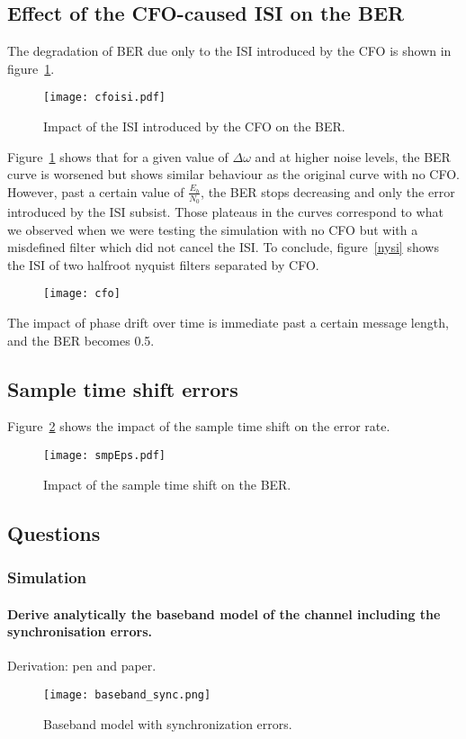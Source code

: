 \subsection{Effect of the CFO-caused ISI on the BER}
The degradation of BER due only to the ISI introduced by the CFO is shown in figure~\ref{fig:cfoisi}.
\begin{figure}[htbp]
\centering
\texttt{[image: cfoisi.pdf]}
\caption{Impact of the ISI introduced by the CFO on the BER.\label{fig:cfoisi}}
\end{figure}
Figure~\ref{fig:cfoisi} shows that for a given value of $\Delta\omega$ and at higher noise levels, the BER curve is worsened but shows similar behaviour as the original curve with no CFO.
However, past a certain value of $\frac{E_b}{N_0}$, the BER stops decreasing and only the error introduced by the ISI subsist.
Those plateaus in the curves correspond to what we observed when we were testing the simulation with no CFO but with a misdefined filter which did not cancel the ISI.
To conclude, figure~\ref{nysi} shows the ISI of two halfroot nyquist filters separated by CFO.
\begin{figure}[htbp]
    \centering
    \texttt{[image: cfo]}
\end{figure}



The impact of phase drift over time is immediate past a certain message length, and the BER becomes 0.5.

\subsection{Sample time shift errors}
Figure~\ref{fig:smpEps} shows the impact of the sample time shift on the error rate.
\begin{figure}[htbp]
\centering
\texttt{[image: smpEps.pdf]}
\caption{Impact of the sample time shift on the BER.\label{fig:smpEps}}
\end{figure}

\subsection{Questions}
\subsubsection{Simulation}

\paragraph{Derive analytically the baseband model of the channel including the synchronisation errors.}
Derivation: pen and paper.
\begin{figure}[htbp]
\texttt{[image: baseband\_sync.png]}
\caption{Baseband model with synchronization errors.\label{fig:sync}}
\end{figure}


